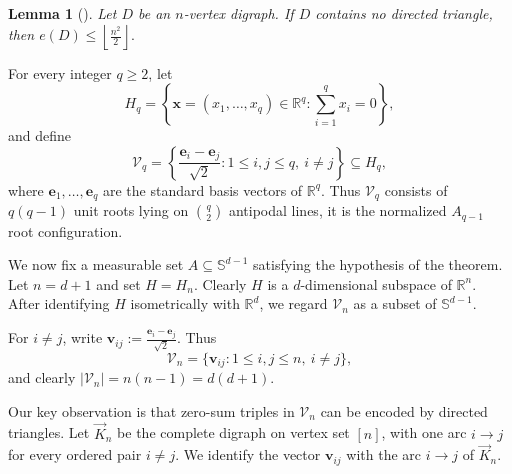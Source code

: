 \documentclass[11pt]{article}
\newtheorem{lemma}[theorem]{Lemma}
\theoremstyle{definition}
\begin{document}
\begin{lemma}[\cite{1970BH}]\label{lem:directed-mantel}
Let \(D\) be an \(n\)-vertex digraph. If \(D\) contains no directed
triangle, then
\(
    e(D)\le \left\lfloor \frac{n^2}{2}\right\rfloor .
\)
\end{lemma}

For every integer \(q\ge 2\), let
\[
    H_q
    =
    \left\{
        \boldsymbol{x}=(x_1,\ldots,x_q)\in\mathbb R^q:
        \sum_{i=1}^q x_i=0
    \right\},
\]
and define
\[
    \mathcal V_q
    =
    \left\{
        \frac{\boldsymbol e_i-\boldsymbol e_j}{\sqrt2}:
        1\le i,j\le q,\ i\ne j
    \right\}
    \subseteq H_q,
\]
where \(\boldsymbol e_1,\ldots,\boldsymbol e_q\) are the standard basis
vectors of \(\mathbb R^q\).  Thus \(\mathcal V_q\) consists of
\(q(q-1)\) unit roots lying on \(\binom q2\) antipodal lines, it is the
normalized \(A_{q-1}\) root configuration. 

We now fix a measurable set \(A\subseteq \mathbb S^{d-1}\) satisfying the
hypothesis of the theorem.  Let \(n=d+1\) and set \(H=H_n\).  Clearly
\(H\) is a \(d\)-dimensional subspace of \(\mathbb R^n\).  After
identifying \(H\) isometrically with \(\mathbb R^d\), we regard
\(\mathcal V_n\) as a subset of \(\mathbb S^{d-1}\).

For \(i\ne j\), write
\(
    \boldsymbol v_{ij}
    :=
    \frac{\boldsymbol e_i-\boldsymbol e_j}{\sqrt2}.
\)
Thus
\[
    \mathcal V_n
    =
    \{\boldsymbol v_{ij}:1\le i,j\le n,\ i\ne j\},\]
and clearly \(
    |\mathcal V_n|=n(n-1)=d(d+1).
\)

Our key observation is that zero-sum triples in \(\mathcal{V}_n\) can be
encoded by directed triangles. Let \(\vec{K}_{n}\) be the complete digraph
on vertex set \([n]\), with one arc \(i\to j\) for every ordered pair
\(i\ne j\).  We identify the vector \(\boldsymbol{v}_{ij}\) with the arc
\(i\to j\) of \(\vec{K}_{n}\).
\end{document}
